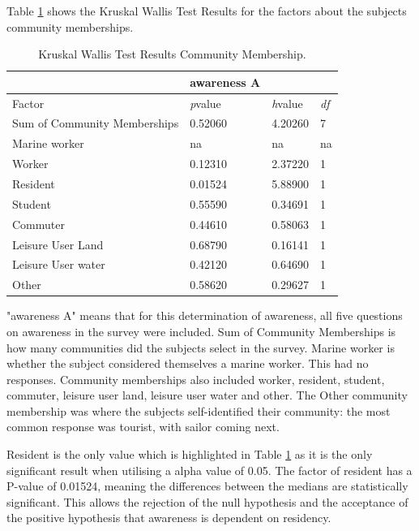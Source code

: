 Table \ref{kw_test_com_membership} shows the Kruskal Wallis Test Results for the factors about the subjects community memberships. 


\begin{table}[H]
    \centering
    \begin{tabular}{|l|l|l|l|}
    \hline
         ~ & \textbf{awareness A} & ~ & ~ \\ \hline
        Factor &\textit{p}value &\textit{h}value & \textit{df} \\ \hline
        Sum of Community Memberships & 0.52060 & 4.20260 & 7 \\ \hline
        Marine worker & na & na & na \\ \hline
        Worker & 0.12310 & 2.37220 & 1 \\ \hline
        Resident & \cellcolor[HTML]{7df9ff} 0.01524 & 5.88900 & 1 \\ \hline
        Student & 0.55590 & 0.34691 & 1 \\ \hline
        Commuter & 0.44610 & 0.58063 & 1 \\ \hline
        Leisure User Land & 0.68790 & 0.16141 & 1 \\ \hline
        Leisure User water & 0.42120 & 0.64690 & 1 \\ \hline
        Other & 0.58620 & 0.29627 & 1 \\ \hline
    \end{tabular}
    \caption{Kruskal Wallis Test Results Community Membership.}{ "awareness A" means that for this determination of awareness, all five questions on awareness in the survey were included. Sum of Community Memberships is how many communities did the subjects select in the survey. Marine worker is whether the subject considered themselves a marine worker. This had no responses. Community memberships also included worker, resident, student, commuter, leisure user land, leisure user water and other. The Other community membership was where the subjects self-identified their community: the most common response was tourist, with sailor coming next. }
    \label{kw_test_com_membership}
\end{table}
Resident is the only value which is highlighted in Table \ref{kw_test_com_membership} as it is the only significant result when utilising a alpha value of 0.05. The factor of resident has a P-value of 0.01524, meaning the differences between the medians are statistically significant. This allows the rejection of the null hypothesis and the acceptance of the positive hypothesis that awareness is dependent on residency. 
